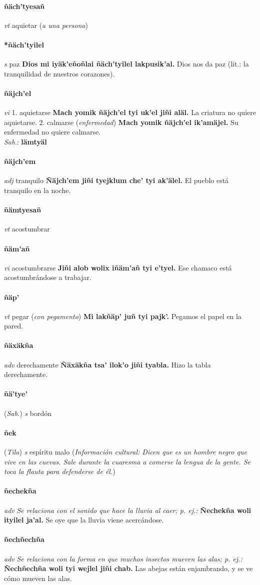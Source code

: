 \documentclass{scrbook}
\newcommand{\entry}[1]{\paragraph{#1}}
\newcommand{\onedefinition}[1]{#1.}
\newcommand{\nontranslationdef}[1]{\textit{#1}}
\newcommand{\partofspeech}[1]{\textit{#1}}
\newcommand{\spanishtranslation}[1]{#1}
\newcommand{\clarification}[1]{(\textit{#1})}
\newcommand{\cholexample}[1]{\textbf{#1}}
\newcommand{\exampletranslation}[1]{#1}
\newcommand{\dialectvariant}[1]{\\\textit{#1}:}
\newcommand{\dialectword}[1]{\textbf{#1}}
\newcommand{\relevantdialect}[1]{(\textit{#1})}
\newcommand{\culturalinformation}[1]{(\textit{#1})}
\begin{document}
\begin{multicols}{2}
\entry{ñäch'tyesañ}
\partofspeech{vt}
\spanishtranslation{aquietar}
\clarification{a una persona}

\entry{*ñäch'tyilel}
\partofspeech{s}
\spanishtranslation{paz}
\cholexample{Dios mi iyäk'eñoñlai ñäch'tyilel lakpusik'al.}
\exampletranslation{Dios nos da paz (lit.: la tranquilidad de nuestros corazones).}

\entry{ñäjch'el}
\partofspeech{vi}
\onedefinition{1}
\spanishtranslation{aquietarse}
\cholexample{Mach yomik ñäjch'el tyi uk'el jiñi aläl.}
\exampletranslation{La criatura no quiere aquietarse.}
\onedefinition{2}
\spanishtranslation{calmarse}
\clarification{enfermedad}
\cholexample{Mach yomik ñäjch'el ik'amäjel.}
\exampletranslation{Su enfermedad no quiere calmarse.}
\dialectvariant{Sab.}
\dialectword{lämtyäl}

\entry{ñäjch'em}
\partofspeech{adj}
\spanishtranslation{tranquilo}
\cholexample{Ñäjch'em jiñi tyejklum che' tyi ak'älel.}
\exampletranslation{El pueblo está tranquilo en la noche.}

\entry{ñämtyesañ}
\partofspeech{vt}
\spanishtranslation{acostumbrar}

\entry{ñäm'añ}
\partofspeech{vi}
\spanishtranslation{acostumbrarse}
\cholexample{Jiñi alob wolix iñäm'añ tyi e'tyel.}
\exampletranslation{Ese chamaco está acostumbrándose a trabajar.}

\entry{ñäp'}
\partofspeech{vt}
\spanishtranslation{pegar}
\clarification{con pegamento}
\cholexample{Mi lakñäp' juñ tyi pajk'.}
\exampletranslation{Pegamos el papel en la pared.}

\entry{ñäxäkña}
\partofspeech{adv}
\spanishtranslation{derechamente}
\cholexample{Ñäxäkña tsa' ilok'o jiñi tyabla.}
\exampletranslation{Hizo la tabla derechamente.}

\entry{ñä'tye'}
\relevantdialect{Sab.}
\partofspeech{s}
\spanishtranslation{bordón}

\entry{ñek}
\relevantdialect{Tila}
\partofspeech{s}
\spanishtranslation{espíritu malo}
\culturalinformation{Información cultural: Dicen que es un hombre negro que vive en las cuevas. Sale durante la cuaresma a comerse la lengua de la gente. Se toca la flauta para defenderse de él.}

\entry{ñechekña}
\partofspeech{adv}
\nontranslationdef{Se relaciona con el sonido que hace la lluvia al caer; p. ej.:}
\cholexample{Ñechekña woli ityilel ja'al.}
\exampletranslation{Se oye que la lluvia viene acercándose.}

\entry{ñechñechña}
\partofspeech{adv}
\nontranslationdef{Se relaciona con la forma en que muchos insectos mueven las alas; p. ej.:}
\cholexample{Ñechñechña woli tyi wejlel jiñi chab.}
\exampletranslation{Las abejas están enjambrando, y se ve cómo mueven las alas.}


\end{multicols}
\end{document}
